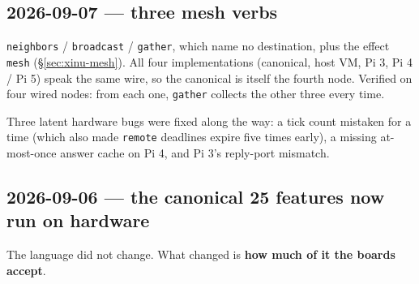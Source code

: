 \documentclass[11pt,a4paper]{article}
\begin{document}
\subsection{2026-09-07 --- three mesh verbs}

\texttt{neighbors} / \texttt{broadcast} / \texttt{gather}, which name no
destination, plus the effect \texttt{mesh} (\S\ref{sec:xinu-mesh}). All four
implementations (canonical, host VM, Pi 3, Pi 4 / Pi 5) speak the same wire, so
the canonical is itself the fourth node. Verified on four wired nodes: from each
one, \texttt{gather} collects the other three every time.

Three latent hardware bugs were fixed along the way: a tick count mistaken for a
time (which also made \texttt{remote} deadlines expire five times early), a
missing at-most-once answer cache on Pi 4, and Pi 3's reply-port mismatch.

\label{sec:migrate-en}

\subsection*{2026-09-06 --- the canonical 25 features now run on hardware}

The language did not change. What changed is \textbf{how much of it the boards
accept}.
\end{document}
